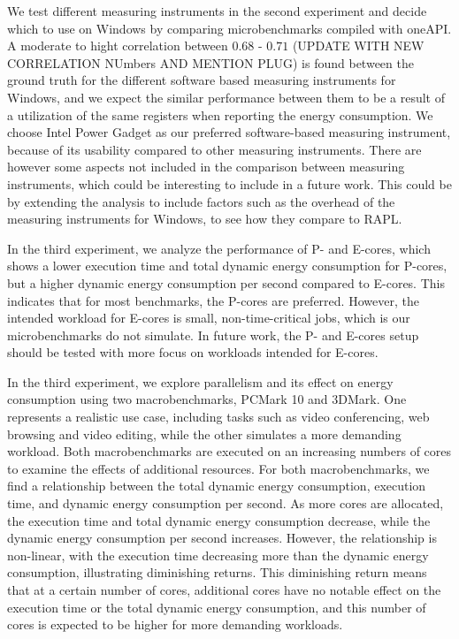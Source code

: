 
We test different measuring instruments in the second experiment and decide which to use on Windows by comparing microbenchmarks compiled with oneAPI. A moderate to hight correlation between $0.68$ - $0.71$ (UPDATE WITH NEW CORRELATION NUmbers AND MENTION PLUG) is found between the ground truth for the different software based measuring instruments for Windows, and we expect the similar performance between them to be a result of a utilization of the same registers when reporting the energy consumption. We choose Intel Power Gadget as our preferred software-based measuring instrument, because of its usability compared to other measuring instruments. There are however some aspects not included in the comparison between measuring instruments, which could be interesting to include in a future work. This could be by extending the analysis to include factors such as the overhead of the measuring instruments for Windows, to see how they compare to RAPL.

In the third experiment, we analyze the performance of P- and E-cores, which shows a lower execution time and total dynamic energy consumption for P-cores, but a higher dynamic energy consumption per second compared to E-cores. This indicates that for most benchmarks, the P-cores are preferred. However, the intended workload for E-cores is small, non-time-critical jobs, which is our microbenchmarks do not simulate. In future work, the P- and E-cores setup should be tested with more focus on workloads intended for E-cores.

In the third experiment, we explore parallelism and its effect on energy consumption using two macrobenchmarks, PCMark 10 and 3DMark. One represents a realistic use case, including tasks such as video conferencing, web browsing and video editing, while the other simulates a more demanding workload. Both macrobenchmarks are executed on an increasing numbers of cores to examine the effects of additional resources. For both macrobenchmarks, we find a relationship between the total dynamic energy consumption, execution time, and dynamic energy consumption per second. As more cores are allocated, the execution time and total dynamic energy consumption decrease, while the dynamic energy consumption per second increases. However, the relationship is non-linear, with the execution time decreasing more than the dynamic energy consumption, illustrating diminishing returns. This diminishing return means that at a certain number of cores, additional cores have no notable effect on the execution time or the total dynamic energy consumption, and this number of cores is expected to be higher for more demanding workloads.


